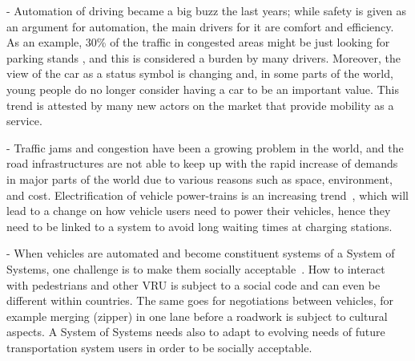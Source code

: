  - Automation of driving became a big buzz the last years; while safety is given as an argument for automation, the main drivers for it are comfort and efficiency. As an example, 30\% of the traffic in congested areas might be just looking for parking stands \cite{Shoup2011thc}, and this is considered a burden by many drivers. Moreover, the view of the car as a status symbol is changing and, in some parts of the world, young people do no longer consider having a car to be an important value. This trend is attested by many new actors on the market that provide mobility as a service.
 
 - Traffic jams and congestion have been a growing problem in the world, and the road infrastructures are not able to keep up with the rapid increase of demands in major parts of the world due to various reasons such as space, environment, and cost. Electrification of vehicle power-trains is an increasing trend~\cite{KPMG}, which will lead to a change on how vehicle users need to power their vehicles, hence they need to be linked to a system to avoid long waiting times at charging stations.
 
 - When vehicles are automated and become constituent systems of a System of Systems, one challenge is to make them socially acceptable~\cite{vinkhuyzen2016}. How to interact with pedestrians and other VRU is subject to a social code and can even be different within countries. The same goes for negotiations between vehicles, for example merging (zipper) in one lane before a roadwork is subject to cultural aspects. A System of Systems needs also to adapt to evolving needs of future transportation system users in order to be socially acceptable.